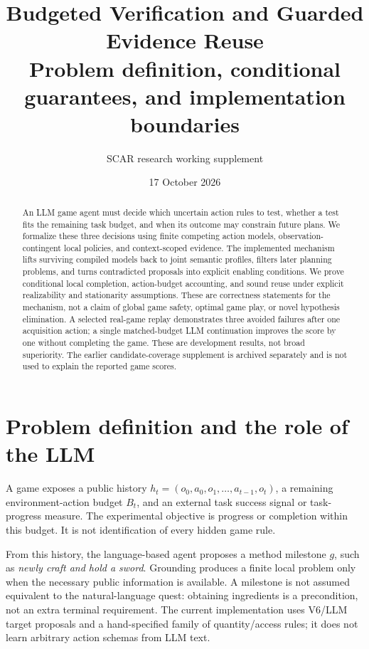 \documentclass[11pt]{article}
\title{Budgeted Verification and Guarded Evidence Reuse\\
\large Problem definition, conditional guarantees, and implementation boundaries}
\author{SCAR research working supplement}
\date{17 October 2026}
\theoremstyle{definition}
\begin{document}
\maketitle
\begin{abstract}
An LLM game agent must decide which uncertain action rules to test, whether a
test fits the remaining task budget, and when its outcome may constrain future
plans. We formalize these three decisions using finite competing action models,
observation-contingent local policies, and context-scoped evidence. The implemented
mechanism lifts surviving compiled models back to joint semantic profiles,
filters later planning problems, and turns contradicted proposals into explicit
enabling conditions. We prove conditional local
completion, action-budget accounting, and sound reuse under explicit realizability
and stationarity assumptions. These are correctness statements for the mechanism,
not a claim of global game safety, optimal game play, or novel hypothesis
elimination. A selected real-game replay demonstrates three avoided failures
after one acquisition action; a single matched-budget LLM continuation improves
the score by one without completing the game. These are development results,
not broad superiority. The earlier
candidate-coverage supplement is archived separately and is not used to explain
the reported game scores.
\end{abstract}

\section{Problem definition and the role of the LLM}
A game exposes a public history $h_t=(o_0,a_0,o_1,\ldots,a_{t-1},o_t)$,
a remaining environment-action budget $B_t$, and an external task success signal
or task-progress measure. The experimental objective is progress or completion
within this budget. It is not identification of every hidden game rule.

From this history, the language-based agent proposes a method milestone $g$,
such as \emph{newly craft and hold a sword}. Grounding produces a finite local
problem only when the necessary public information is available. A milestone is
not assumed equivalent to the natural-language quest: obtaining ingredients is
a precondition, not an extra terminal requirement. The current implementation
uses V6/LLM target proposals and a hand-specified family of quantity/access rules;
it does not learn arbitrary action schemas from LLM text.
\end{document}

